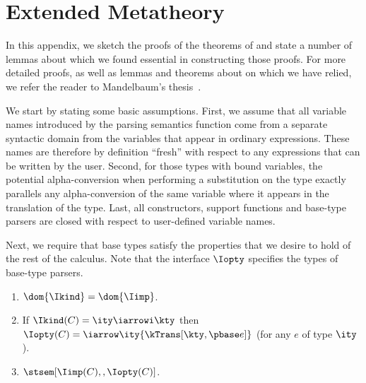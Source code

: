\appendix
\section{Extended Metatheory}
\label{app:ddc-meta-theory}
In this appendix, we sketch the proofs of the theorems
of  and state a number of lemmas about \ddc{} which we found essential in constructing those proofs. For more detailed proofs, as well as lemmas and theorems about \fomega{} on which we have relied, we refer the reader to Mandelbaum's thesis~\cite{mandelbaum:thesis}.

We start by stating some basic
assumptions.  First, we assume that all variable names
introduced by the parsing semantics function come from a separate
syntactic domain from the variables that appear in ordinary
expressions. These names are therefore by definition ``fresh'' with respect
to any expressions that can be written by the user.  Second, for those
types with bound variables, the potential alpha-conversion when
performing a substitution on the type exactly parallels any
alpha-conversion of the same variable where it appears in the
translation of the type. Last, all constructors, support functions and
base-type parsers are closed with respect to user-defined variable
names.

Next, we require that \ddc{} base types satisfy the properties that we
desire to hold of the rest of the calculus.  Note that the interface $\Iopty$ specifies the types of base-type parsers.

\begin{condition}
\label{cond:base-types}
  \begin{enumerate}
  \item $\dom {\Ikind} = \dom {\Iimp}$.
  \item If $\Ikind(C) = {\ity \iarrowi \kty}$ then $\Iopty(C) =
    \iarrow \ity {\kTrans[\kty,\pbase e]}$ (for any $e$ of type $\ity$).
  \item $\stsem[\Iimp(C),,\Iopty(C)]$.
    \label{cond:closed-op}
  \end{enumerate}
\end{condition}


